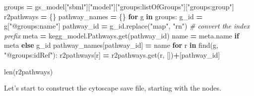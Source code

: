 \documentclass[
]{book}
\newenvironment{Shaded}{\begin{snugshade}}{\end{snugshade}}
\newcommand{\BuiltInTok}[1]{#1}
\newcommand{\CommentTok}[1]{\textcolor[rgb]{0.56,0.35,0.01}{\textit{#1}}}
\newcommand{\ControlFlowTok}[1]{\textcolor[rgb]{0.13,0.29,0.53}{\textbf{#1}}}
\newcommand{\KeywordTok}[1]{\textcolor[rgb]{0.13,0.29,0.53}{\textbf{#1}}}
\newcommand{\NormalTok}[1]{#1}
\newcommand{\OperatorTok}[1]{\textcolor[rgb]{0.81,0.36,0.00}{\textbf{#1}}}
\newcommand{\StringTok}[1]{\textcolor[rgb]{0.31,0.60,0.02}{#1}}
\begin{document}
\begin{Shaded}
\begin{Highlighting}[numbers=left,,]
\NormalTok{groups }\OperatorTok{=}\NormalTok{ gs\_model[}\StringTok{"sbml"}\NormalTok{][}\StringTok{"model"}\NormalTok{][}\StringTok{"groups:listOfGroups"}\NormalTok{][}\StringTok{"groups:group"}\NormalTok{]}
\NormalTok{r2pathways }\OperatorTok{=}\NormalTok{ \{\}}
\NormalTok{pathway\_names }\OperatorTok{=}\NormalTok{ \{\}}
\ControlFlowTok{for}\NormalTok{ g }\KeywordTok{in}\NormalTok{ groups:}
\NormalTok{    g\_id }\OperatorTok{=}\NormalTok{ g[}\StringTok{"@groups:name"}\NormalTok{]}
\NormalTok{    pathway\_id }\OperatorTok{=}\NormalTok{ g\_id.replace(}\StringTok{"map"}\NormalTok{, }\StringTok{"rn"}\NormalTok{) }\CommentTok{\# convert the index prefix}
\NormalTok{    meta }\OperatorTok{=}\NormalTok{ kegg\_model.Pathways.get(pathway\_id)}
\NormalTok{    name }\OperatorTok{=}\NormalTok{ meta.name }\ControlFlowTok{if}\NormalTok{ meta }\ControlFlowTok{else}\NormalTok{ g\_id}
\NormalTok{    pathway\_names[pathway\_id] }\OperatorTok{=}\NormalTok{ name}
    \ControlFlowTok{for}\NormalTok{ r }\KeywordTok{in}\NormalTok{ find(g, }\StringTok{"@groups:idRef"}\NormalTok{):}
\NormalTok{        r2pathways[r] }\OperatorTok{=}\NormalTok{ r2pathways.get(r, [])}\OperatorTok{+}\NormalTok{[pathway\_id]}

\BuiltInTok{len}\NormalTok{(r2pathways)}
\end{Highlighting}
\end{Shaded}

Let's start to construct the cytoscape save file, starting with the nodes.
\end{document}
